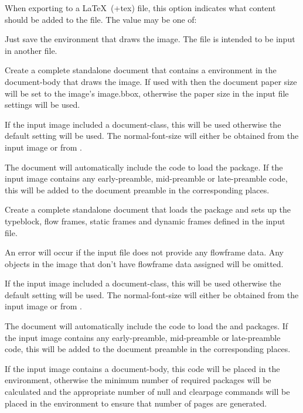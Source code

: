 \documentclass[toc=listof]{scrarticle}
\newcommand{\convswitchdef}[1]{\switchdef{jdrconverter.#1}}
\begin{document}
\convswitchdef{export-latex}

When exporting to a \LaTeX\ (\ext+{tex}) file, this option indicates
what content should be added to the file. The value may be one of:
\begin{deflist}
\begin{itemdesc}
Just save the  environment that draws the image.
The  file is intended to be \gls{input} in another file.
\end{itemdesc}

\begin{itemdesc}
Create a complete standalone document that contains a
 environment in the \gls{document-body} that draws the image.
If used with  then the document \gls{paper} size will be set
to the image's \gls{image.bbox}, otherwise the paper size in the input
file settings will be used.

If the input image included a \gls{document-class}, this will be used
otherwise the default setting will be used. The
\gls{normal-font-size} will either be obtained from the input image
or from .

The document will automatically include the code to load the
 package.
If the input image contains any \gls{early-preamble}, 
\gls{mid-preamble} or \gls{late-preamble} code, this will be added
to the document preamble in the corresponding places.
\end{itemdesc}

\begin{itemdesc}
Create a complete standalone document that loads the 
package and sets up the \gls{typeblock}, flow frames, static frames
and dynamic frames defined in the input file.

\begin{important}
An error will occur if the input file does not provide any 
\gls{flowframe} data.
Any \glspl{object} in the image that don't have \gls{flowframe} data
assigned will be omitted.
\end{important}

If the input image included a \gls{document-class}, this will be used
otherwise the default setting will be used. The
\gls{normal-font-size} will either be obtained from the input image
or from .

The document will automatically include the code to load the
 and  packages.
If the input image contains any \gls{early-preamble}, 
\gls{mid-preamble} or \gls{late-preamble} code, this will be added
to the document preamble in the corresponding places.

If the input image contains a \gls{document-body}, this code
will be placed in the  environment, otherwise
the minimum number of required packages will be calculated
and the appropriate number of \gls{null} and \gls{clearpage}
commands will be placed in the
 environment to ensure that number of pages are
generated.

\end{itemdesc}

\end{deflist}
\end{document}
